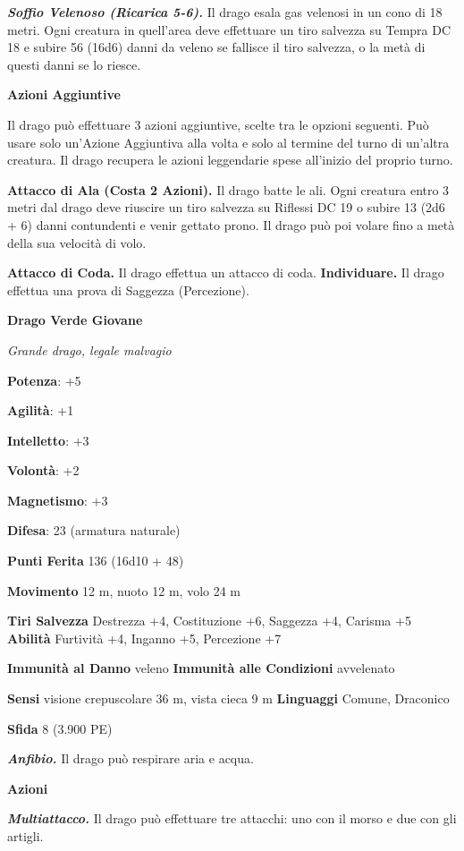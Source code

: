 \begin{multicols}{2}
\emph{\textbf{Soffio Velenoso (Ricarica 5-6).}} Il drago esala gas
velenosi in un cono di 18 metri. Ogni creatura in quell'area deve
effettuare un tiro salvezza su Tempra DC 18 e subire 56 (16d6)
danni da veleno se fallisce il tiro salvezza, o la metà di questi danni
se lo riesce.

\textbf{Azioni Aggiuntive}

Il drago può effettuare 3 azioni aggiuntive, scelte tra le opzioni
seguenti. Può usare solo un'Azione Aggiuntiva alla volta e solo al
termine del turno di un'altra creatura. Il drago recupera le azioni
leggendarie spese all'inizio del proprio turno.

\textbf{Attacco di Ala (Costa 2 Azioni).} Il drago batte le ali. Ogni
creatura entro 3 metri dal drago deve riuscire un tiro salvezza su Riflessi DC 19 o subire 13 (2d6 + 6) danni contundenti e venir gettato
prono. Il drago può poi volare fino a metà della sua velocità di volo.

\textbf{Attacco di Coda.} Il drago effettua un attacco di coda.
\textbf{Individuare.} Il drago effettua una prova di Saggezza
(Percezione).

\textbf{Drago Verde Giovane}

\emph{Grande drago, legale malvagio}

\textbf{Potenza}: +5

\textbf{Agilità}: +1

\textbf{Intelletto}: +3

\textbf{Volontà}: +2

\textbf{Magnetismo}: +3

\textbf{Difesa}: 23 (armatura naturale)

\textbf{Punti Ferita} 136 (16d10 + 48)

\textbf{Movimento} 12 m, nuoto 12 m, volo 24 m

\textbf{Tiri Salvezza} Destrezza +4, Costituzione +6, Saggezza +4,
Carisma +5 \textbf{Abilità} Furtività +4, Inganno +5, Percezione +7

\textbf{Immunità al Danno} veleno \textbf{Immunità alle Condizioni}
avvelenato

\textbf{Sensi} visione crepuscolare 36 m, vista cieca 9 m
\textbf{Linguaggi} Comune, Draconico

\textbf{Sfida} 8 (3.900 PE)

\emph{\textbf{Anfibio.}} Il drago può respirare aria e acqua.

\textbf{Azioni}

\emph{\textbf{Multiattacco.}} Il drago può effettuare tre attacchi: uno
con il morso e due con gli artigli.


\end{multicols}
